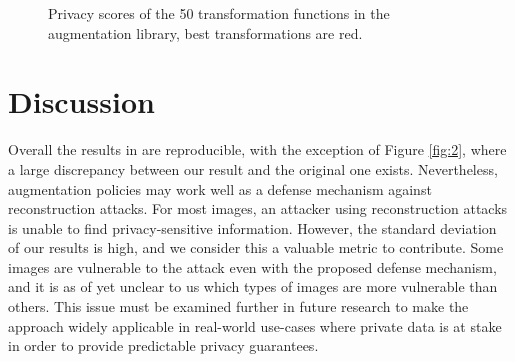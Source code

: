 \begin{figure}[h]
    \centering
    \hspace{5mm}
    \caption{Privacy scores of the 50 transformation functions in the augmentation library, best transformations are red.}
    \label{fig:5}
\end{figure}

\section{Discussion}
\label{sec:discussion}

Overall the results in \cite{gao2021privacy} are reproducible, with the exception of Figure \ref{fig:2}, where a large discrepancy between our result and the original one exists. Nevertheless, augmentation policies may work well as a defense mechanism against reconstruction attacks. For most images, an attacker using reconstruction attacks is unable to find privacy-sensitive information. However, the standard deviation of our results is high, and we consider this a valuable metric to contribute. Some images are vulnerable to the attack even with the proposed defense mechanism, and it is as of yet unclear to us which types of images are more vulnerable than others. This issue must be examined further in future research to make the approach widely applicable in real-world use-cases where private data is at stake in order to provide predictable privacy guarantees.

